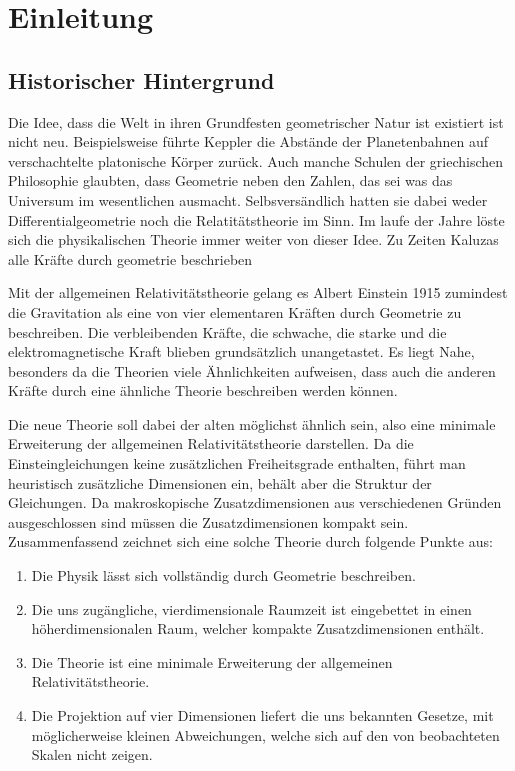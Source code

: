 \chapter{Einleitung}
\section{Historischer Hintergrund}
Die Idee, dass die Welt in ihren Grundfesten geometrischer Natur ist
existiert ist nicht neu.
Beispielsweise führte Keppler die Abstände der Planetenbahnen auf
verschachtelte platonische Körper zurück. Auch manche Schulen der griechischen
Philosophie glaubten, dass Geometrie neben den Zahlen, das sei was das Universum
im wesentlichen ausmacht.
Selbsversändlich hatten sie dabei weder Differentialgeometrie noch die 
Relatitätstheorie im Sinn.
Im laufe der Jahre löste sich die physikalischen Theorie immer weiter von dieser Idee. 
Zu Zeiten Kaluzas alle Kräfte durch geometrie beschrieben


Mit der allgemeinen Relativitätstheorie gelang es Albert Einstein 1915
zumindest die Gravitation als eine von vier elementaren Kräften durch Geometrie
zu beschreiben. Die verbleibenden Kräfte, die schwache, die starke und die elektromagnetische Kraft
blieben grundsätzlich unangetastet. Es liegt Nahe, besonders da die Theorien
viele Ähnlichkeiten aufweisen, dass auch die anderen Kräfte durch eine ähnliche
Theorie beschreiben werden können.

Die neue Theorie soll dabei der alten 
möglichst ähnlich sein, also eine minimale Erweiterung der allgemeinen
Relativitätstheorie darstellen.
Da die Einsteingleichungen keine
zusätzlichen Freiheitsgrade enthalten, führt man heuristisch zusätzliche
Dimensionen ein, behält aber die Struktur der Gleichungen.
Da makroskopische Zusatzdimensionen aus verschiedenen Gründen ausgeschlossen
sind müssen die Zusatzdimensionen kompakt sein.
Zusammenfassend zeichnet sich eine solche Theorie durch folgende Punkte aus:
\begin{enumerate}
\item Die Physik lässt sich vollständig durch Geometrie beschreiben.
\item Die uns zugängliche, vierdimensionale Raumzeit ist eingebettet in einen
höherdimensionalen Raum, welcher kompakte Zusatzdimensionen enthält.
\item Die Theorie ist eine minimale Erweiterung der allgemeinen
Relativitätstheorie.
\item Die Projektion auf vier Dimensionen liefert die uns bekannten Gesetze, mit
möglicherweise kleinen Abweichungen, welche sich auf den von beobachteten Skalen
nicht zeigen.
\end{enumerate}